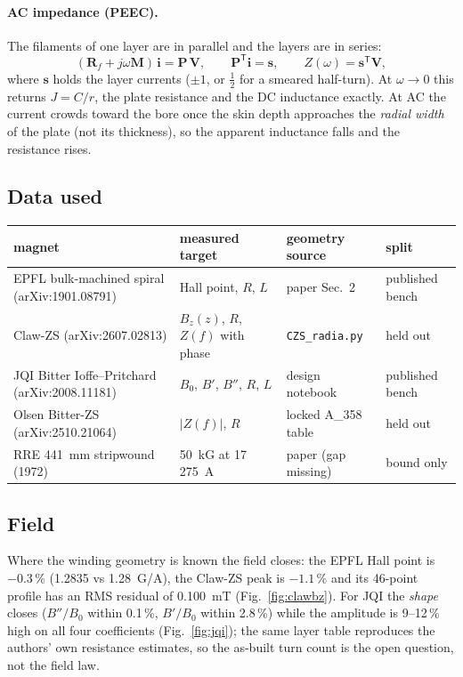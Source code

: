\paragraph{AC impedance (PEEC).}
The filaments of one layer are in parallel and the layers are in series:
\begin{equation}
(\mathbf R_f + j\omega\mathbf M)\,\mathbf i=\mathbf P\,\mathbf V,\qquad \mathbf P^{\mathsf T}\mathbf i=\mathbf s,\qquad Z(\omega)=\mathbf s^{\mathsf T}\mathbf V,
\end{equation}
where $\mathbf s$ holds the layer currents ($\pm1$, or $\tfrac12$ for a smeared half-turn).
At $\omega\to0$ this returns $J=C/r$, the plate resistance and the DC inductance exactly.
At AC the current crowds toward the bore once the skin depth approaches the \emph{radial width} of the plate (not its thickness), so the apparent inductance falls and the resistance rises.

\subsection{Data used}
\begin{center}\small
\begin{tabular}{@{}llll@{}}
\toprule
magnet & measured target & geometry source & split \\
\midrule
EPFL bulk-machined spiral (arXiv:1901.08791) & Hall point, $R$, $L$ & paper Sec.~2 & published bench\\
Claw-ZS (arXiv:2607.02813) & $B_z(z)$, $R$, $Z(f)$ with phase & \texttt{CZS\_radia.py} & held out\\
JQI Bitter Ioffe--Pritchard (arXiv:2008.11181) & $B_0$, $B'$, $B''$, $R$, $L$ & design notebook & published bench\\
Olsen Bitter-ZS (arXiv:2510.21064) & $|Z(f)|$, $R$ & locked A\_358 table & held out\\
RRE 441~mm stripwound (1972) & 50~kG at 17\,275~A & paper (gap missing) & bound only\\
\bottomrule
\end{tabular}\end{center}

\subsection{Field}
Where the winding geometry is known the field closes: the EPFL Hall point is $-0.3$\,\% (1.2835 vs 1.28~G/A), the Claw-ZS peak is $-1.1$\,\% and its 46-point profile has an RMS residual of 0.100~mT (Fig.~\ref{fig:clawbz}).
For JQI the \emph{shape} closes ($B''/B_0$ within 0.1\,\%, $B'/B_0$ within 2.8\,\%) while the amplitude is 9--12\,\% high on all four coefficients (Fig.~\ref{fig:jqi}); the same layer table reproduces the authors' own resistance estimates, so the as-built turn count is the open question, not the field law.

